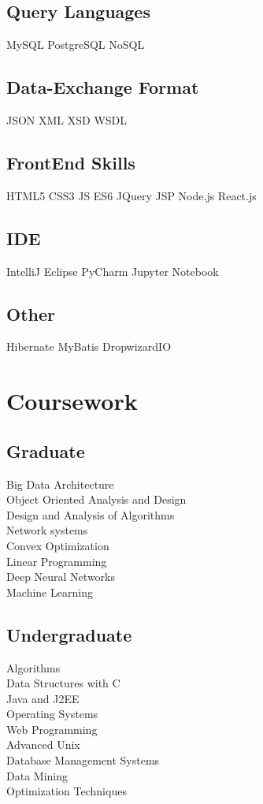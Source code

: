 \documentclass[]{deedy-resume-openfont}
\begin{document}
\begin{minipage}[t]{0.33\textwidth}
\subsection{Query Languages}
MySQL \textbullet{}PostgreSQL \textbullet{} NoSQL\\
\subsection{Data-Exchange Format}
JSON \textbullet{} XML \textbullet{} XSD \textbullet{} WSDL \\
\subsection{FrontEnd Skills}
HTML5 \textbullet{} CSS3 \textbullet{} JS ES6 \textbullet{} JQuery \textbullet{}
JSP \textbullet{} Node.js \textbullet{} React.js
\subsection{IDE }
IntelliJ \textbullet{} Eclipse \textbullet{} PyCharm \textbullet{} Jupyter Notebook\\
\subsection{Other }
Hibernate \textbullet{} MyBatis \textbullet{} DropwizardIO  

\section{Coursework}
\subsection{Graduate}
Big Data Architecture\\
Object Oriented Analysis and Design \\
Design and Analysis of Algorithms \\
Network systems \\
Convex Optimization \\
Linear Programming \\
Deep Neural Networks \\
Machine Learning \\

\sectionsep 
\subsection{Undergraduate}
Algorithms \\
Data Structures with C \\
Java and J2EE\\
Operating Systems \\
Web Programming \\
Advanced Unix\\
Database Management Systems\\
Data Mining\\
Optimization Techniques\\
\sectionsep


\end{minipage}
\end{document}
